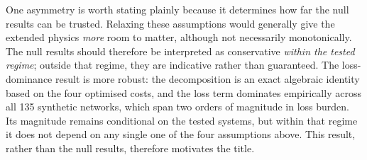 One asymmetry is worth stating plainly because it determines how far the null results can be
trusted. Relaxing these assumptions would generally give the extended physics \emph{more} room
to matter, although not necessarily monotonically. The null results should therefore be
interpreted as conservative \emph{within the tested regime}; outside that regime, they are
indicative rather than guaranteed. The loss-dominance result is more robust: the decomposition
is an exact algebraic identity based on the four optimised costs, and the loss term dominates
empirically across all 135 synthetic networks, which span two orders of magnitude in loss
burden. Its magnitude remains conditional on the tested systems, but within that regime it
does not depend on any single one of the four assumptions above. This result, rather than the
null results, therefore motivates the title.
